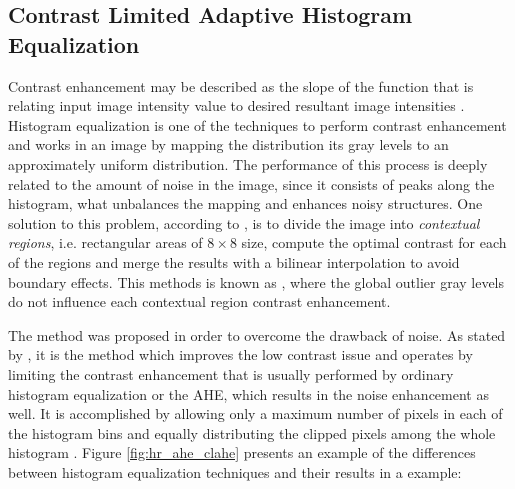 \subsection{Contrast Limited Adaptive Histogram Equalization}

Contrast enhancement may be described as the slope of the function that is relating input image intensity value to desired resultant image intensities \cite{sonali2019approach}. Histogram equalization is one of the techniques to perform contrast enhancement and works in an image by mapping the distribution its gray levels to an approximately uniform distribution. The performance of this process is deeply related to the amount of noise in the image, since it consists of peaks along the histogram, what unbalances the mapping and enhances noisy structures. One solution to this problem, according to , is to divide the image into \emph{contextual regions}, i.e. rectangular areas of $8 \times 8$ size, compute the optimal contrast for each of the regions and merge the results with a bilinear interpolation to avoid boundary effects. This methods is known as , where the global outlier gray levels do not influence each contextual region contrast enhancement.

The  method was proposed in order to overcome the drawback of noise. As stated by , it is the method which improves the low contrast issue and operates by limiting the contrast enhancement that is usually performed by ordinary histogram equalization or the AHE, which results in the noise enhancement as well. It is accomplished by allowing only a maximum number of pixels in each of the histogram bins and equally distributing the clipped pixels among the whole histogram \cite{zuiderveld1994constrast}. Figure \ref{fig:hr_ahe_clahe} presents an example of the differences between histogram equalization techniques and their results in a  example:


